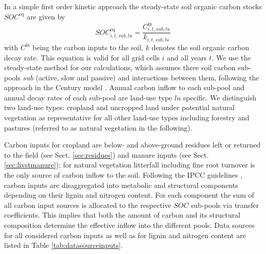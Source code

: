 \documentclass[gc, manuscript]{copernicus}
\begin{document}
In a simple first order kinetic approach the steady-state soil organic carbon stocks \(SOC^{\mathrm{eq}}\) are given by
\begin{equation}
SOC^{\mathrm{eq}}_{i,t,sub,lu} =\frac{C^{\mathrm{in}}_{i,t,sub,lu}}{k_{i,t,sub,lu}}
\label{eq:inoutflow}
\end{equation}
with \(C^{\textrm{in}}\) being the carbon inputs to the soil, \(k\) denotes the soil organic carbon decay rate. This equation is valid for all grid cells \(i\) and all years \(t\). We use the steady-state method for our calculations, which assumes three soil carbon sub-pools \(sub\) (active, slow and passive) and interactions between them, following the approach in the Century model \citep{parton_analysis_1987}. Annual carbon inflow to each sub-pool and annual decay rates of each sub-pool are land-use type \(lu\) specific.
We distinguish two land-use types: cropland and uncropped land under potential natural vegetation as representative for all other land-use types including forestry and pastures (referred to as natural vegetation in the following).

Carbon inputs for cropland are below- and above-ground residues left or returned to the field (see Sect. \ref{sec:residues}) and manure inputs (see Sect. \ref{sec:livstmanure}); for natural vegetation litterfall including fine root turnover \citep{schaphoff_lpjml4_2018} is the only source of carbon inflow to the soil. Following the IPCC guidelines \citep{calvo_buendia_ipcc_2019}, carbon inputs are disaggregated into metabolic and structural components depending on their lignin and nitrogen content. For each component the sum of all carbon input sources is allocated to the respective \(SOC\) sub-pools via transfer coefficients. This implies that both the amount of carbon and its structural composition determine the effective inflow into the different pools. Data sources for all considered carbon inputs as well as for lignin and nitrogen content are listed in Table \ref{tab:datasourceinputs}.
\end{document}
